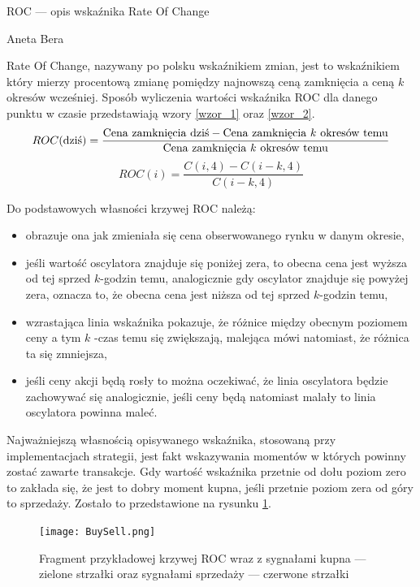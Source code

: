 \documentclass[12pt,a4paper]{article}
\begin{document}
\begin{center}
\begin{large}
ROC --- opis wskaźnika Rate Of Change\\
\end{large}
Aneta Bera
\end{center}

Rate Of Change, nazywany po polsku wskaźnikiem zmian, jest to wskaźnikiem który
mierzy procentową zmianę pomiędzy najnowszą ceną
zamknięcia a ceną $k$ okresów wcześniej. Sposób wyliczenia wartości wskaźnika ROC dla danego punktu w czasie przedstawiają wzory \ref{wzor_1} oraz \ref{wzor_2}.
\begin{equation}
ROC(\text{dziś}) = \frac{\text{Cena zamknięcia dziś} - \text{Cena zamknięcia } k \text{ okresów temu}}{\text{Cena zamknięcia } k \text{ okresów temu}}\\
\label{wzor_1}
\end{equation}
\begin{equation}
ROC(i) = \frac{C(i,4) - C(i-k,4)}{C(i-k,4)}
\label{wzor_2}
\end{equation}

\noindent Do podstawowych własności krzywej ROC należą:
\begin{itemize}
\item obrazuje ona jak zmieniała się cena obserwowanego rynku w danym okresie,
\item jeśli wartość oscylatora znajduje się poniżej zera, to obecna cena jest wyższa od tej sprzed $k$-godzin temu, analogicznie gdy oscylator znajduje się powyżej zera, oznacza to, że obecna cena jest niższa od tej sprzed $k$-godzin temu,
\item wzrastająca linia wskaźnika pokazuje, że różnice między
obecnym poziomem ceny a tym $k$ -czas temu się
zwiększają, malejąca mówi natomiast, że różnica ta się zmniejsza,
\item jeśli ceny akcji będą rosły to można oczekiwać, że linia
oscylatora będzie zachowywać się analogicznie, jeśli ceny będą natomiast malały to linia oscylatora powinna maleć.
\end{itemize}
Najważniejszą własnością opisywanego wskaźnika, stosowaną przy implementacjach strategii, jest fakt wskazywania momentów w których powinny zostać zawarte transakcje. Gdy wartość wskaźnika przetnie od dołu poziom zero to zakłada się, że jest to dobry moment kupna, jeśli przetnie poziom zera od góry to sprzedaży. Zostało to przedstawione na rysunku \ref{kupsprz}. \\
\begin{figure}[h!]
\centering
\texttt{[image: BuySell.png]}
\caption{Fragment przykładowej krzywej ROC wraz z sygnałami kupna --- zielone strzałki oraz sygnałami sprzedaży --- czerwone strzałki}
\label{kupsprz}
\end{figure}
\FloatBarrier
\end{document}
